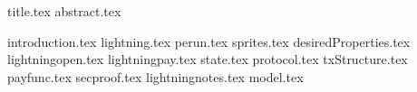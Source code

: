 \documentclass[11pt]{llncs}
\begin{document}
{title.tex}
\thispagestyle{plain}
{abstract.tex}

{introduction.tex}
{lightning.tex}
{perun.tex}
{sprites.tex}
{desiredProperties.tex}
{lightningopen.tex}
{lightningpay.tex}
{state.tex}
{protocol.tex}
{txStructure.tex}
{payfunc.tex}
{secproof.tex}
{lightningnotes.tex}
{model.tex}

\end{document}
